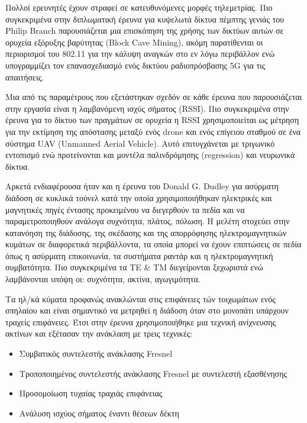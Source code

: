 \documentclass[12pt, greek]{article}
\begin{document}
\begin{multicols*}{2}
        Πολλοί ερευνητές έχουν στραφεί σε κατευθυνόμενες μορφές τηλεμετρίας. Πιο συγκεκριμένα 
        στην διπλωματική έρευνα για κυψελωτά δίκτυα πέμπτης γενιάς του Philip Branch
        \cite{branch_fifth_2021} παρουσιάζεται μια επισκόπηση της χρήσης των δικτύων αυτών σε
        ορυχεία εξόρυξης βαρύτητας (Block Cave Mining), ακόμη παρατίθενται οι περιορισμοί του
        802.11 για την κάλυψη αναγκών στο εν λόγω περιβάλλον ενώ υπογραμμίζει τον επανασχεδιασμό
        ενός δικτύου ραδιοπρόσβασης 5G για τις απαιτήσεις.

        Μια από τις παραμέτρους που εξετάστηκαν σχεδόν σε κάθε έρευνα που παρουσιάζεται στην εργασία
        είναι η λαμβανόμενη ισχύς σήματος (RSSI). Πιο συγκεκριμένα στην έρευνα για το δίκτυο των
        πραγμάτων σε ορυχεία \cite{ming_study_2019} η RSSI χρησιμοποιείται ως μέτρηση για την 
        εκτίμηση της απόστασης μεταξύ ενός drone και ενός επίγειου σταθμού σε ένα σύστημα 
        UAV (Unmanned Aerial Vehicle). Αυτό επιτυγχάνεται με τριγωνικό εντοπισμό ενώ προτείνονται
        και μοντέλα παλινδρόμησης (regression) και νευρωνικά δίκτυα.

        Αρκετά ενδιαφέρουσα ήταν και η έρευνα του Donald G. Dudley για ασύρματη διάδοση σε κυκλικά
        τούνελ \cite{dudley_wireless_2005} κατά την οποία χρησιμοποιήθηκαν ηλεκτρικές και μαγνητικές
        πηγές έντασης προκειμένου να διεγερθούν τα πεδία και να παραμετροποιηθούν ανάλογα \cdot
        συχνότητα, πλάτος, πόλωση. Η μελέτη στοχεύει στην κατανόηση της διάδοσης, της σκέδασης και
        της απορρόφησης ηλεκτρομαγνητικών κυμάτων σε διαφορετικά περιβάλλοντα, τα οποία μπορεί να 
        έχουν επιπτώσεις σε πεδία όπως η ασύρματη επικοινωνία, τα συστήματα ραντάρ και η 
        ηλεκτρομαγνητική συμβατότητα. Πιο συγκεκριμένα τα ΤΕ \& ΤΜ διεγείρονται ξεχωριστά ενώ
        λαμβάνονται υπόψη οι: συχνότητα, ακτίνα, αγωγιμότητα.

        Τα ηλ/κά κύματα προφανώς ανακλώνται στις επιφάνειες τών τοιχωμάτων ενός σπηλαίου και
        είναι σημαντικό να μετρηθεί η διάδοση όταν στο μονοπάτι υπάρχουν τραχείς επιφάνειες.
        Έτσι στην έρευνα \cite{soo_investigation_2018} χρησιμοποιήθηκε μια τεχνική ανίχνευσης 
        ακτίνων και εξέτασαν την ανάκλαση με τρεις τεχνικές:
        \begin{itemize}
            \item Συμβατικός συντελεστής ανάκλασης Fresnel
            \item Τροποποιημένος συντελεστής ανάκλασης Fresnel με συντελεστή εξασθένησης
            \item Προσομοίωση τυχαίας τραχιάς επιφάνειας
            \item Ανάλυση ισχύος σήματος έναντι θέσεων δέκτη
        \end{itemize}


\end{multicols*}
\end{document}
